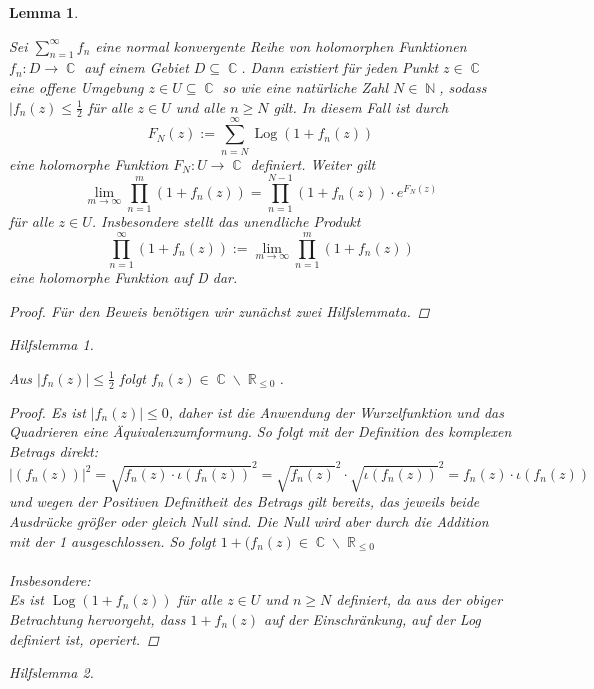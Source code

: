 \documentclass[10pt,a4paper]{article}
\theoremstyle{plain}
\newtheorem{lem}[thm]{Lemma}
\theoremstyle{definition}
\theoremstyle{remark}
\newtheorem{hilfslem}{Hilfslemma}
\DeclareMathOperator{\R}{\mathbb{R}}
\DeclareMathOperator{\C}{\mathbb{C}}
\DeclareMathOperator{\N}{\mathbb{N}}
\DeclareMathOperator{\Log}{Log}
\begin{document}
\begin{lem}\label{lemma12}

Sei $\sum_{n =1}^\infty f_{\textit{n}}$ eine normal konvergente Reihe von holomorphen Funktionen $f_{\textit{n}}: \textit{D}\rightarrow\C $ auf einem Gebiet
$D\subseteq\C$. Dann existiert für jeden Punkt $ z \in \C$ eine offene Umgebung $z \in U \subseteq \C$ so wie eine natürliche Zahl $N \in \N$, sodass $|f_{\textit{n}}(z) \leq \frac{1}{2}$ für alle $z \in U $ und alle $n \geq N $ gilt. In diesem Fall ist durch $$F_{N}(z) := \sum_{n = N}^\infty \Log( 1 + f_{n}(z))$$ eine holomorphe Funktion $F_{N} : U \rightarrow \C$ definiert. Weiter gilt $$\lim_{m\rightarrow\infty}\prod_{n=1}^m ( 1 + f_{n}(z)) = \prod_{n=1}^{N-1} ( 1 + f_{n}(z))\cdot e^{F_{N}(z)}$$ für alle $z \in U$. Insbesondere stellt das unendliche Produkt$$\prod_{n=1}^\infty ( 1 + f_{n}(z)) := \lim_{m\rightarrow\infty}\prod_{n=1}^m ( 1 + f_{n}(z))$$ eine holomorphe Funktion auf D dar.

\begin{proof}\renewcommand{\qedsymbol}{}
Für den Beweis benötigen wir zunächst zwei Hilfslemmata. 
\end{proof}

\begin{hilfslem}\label{hilfslemma1}

Aus $|f_n(z)|\leq \frac{1}{2}$ folgt $f_n(z) \in \C\backslash\R_{\leq 0}$. 

\begin{proof}
Es ist $|f_n(z)|\leq 0$, daher ist die Anwendung der Wurzelfunktion und das Quadrieren eine Äquivalenzumformung. So folgt mit der Definition des komplexen Betrags direkt:
$$|(f_n(z))|^2=\sqrt{f_n(z)\cdot {\iota (f_n(z))}}^2=\sqrt{f_n(z)}^2\cdot\sqrt{{\iota (f_n(z))}}^2= f_n(z)\cdot{\iota (f_n(z))}$$und wegen der Positiven Definitheit des Betrags gilt bereits, das jeweils beide Ausdrücke größer oder gleich Null sind. Die Null wird aber durch die Addition mit der 1 ausgeschlossen. So folgt $1+(f_n(z) \in \C \backslash \R_{\leq 0}$
\\
\\
Insbesondere:
\\
Es ist $\Log( 1 + f_{n}(z))$ für alle $z \in U $ und $n \geq N$ definiert, da aus der obiger Betrachtung hervorgeht, dass $1+f_n(z)$ auf der Einschränkung, auf der Log definiert ist, operiert.

\end{proof}
\end{hilfslem}

\begin{hilfslem}\label{hilfslemma2}


\end{hilfslem}
\end{lem}
\end{document}
